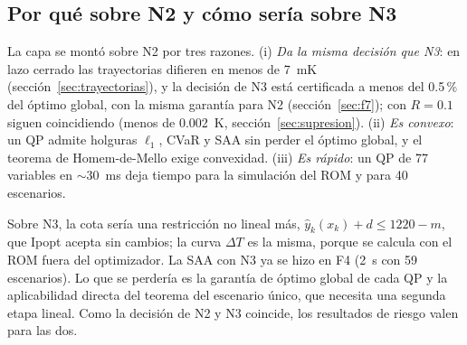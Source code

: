 \subsection{Por qué sobre N2 y cómo sería sobre N3}
La capa se montó sobre N2 por tres razones. (i) \emph{Da la misma decisión que N3}: en lazo
cerrado las trayectorias difieren en menos de 7~mK (sección~\ref{sec:trayectorias}), y la
decisión de N3 está certificada a menos del 0.5\,\% del óptimo global, con la misma garantía para
N2 (sección~\ref{sec:f7}); con $R=0.1$ siguen coincidiendo (menos de 0.002~K,
sección~\ref{sec:supresion}). (ii) \emph{Es convexo}: un QP admite holguras $\ell_1$, CVaR y SAA
sin perder el óptimo global, y el teorema de Homem-de-Mello exige convexidad. (iii) \emph{Es
rápido}: un QP de 77 variables en $\sim30$~ms deja tiempo para la simulación del ROM y para 40
escenarios.

Sobre N3, la cota sería una restricción no lineal más, $\hat y_k(x_k)+d\le1220-m$, que Ipopt
acepta sin cambios; la curva $\Delta T$ es la misma, porque se calcula con el ROM fuera del
optimizador. La SAA con N3 ya se hizo en F4 (2~s con 59 escenarios). Lo que se perdería es la
garantía de óptimo global de cada QP y la aplicabilidad directa del teorema del escenario único,
que necesita una segunda etapa lineal. Como la decisión de N2 y N3 coincide, los resultados de
riesgo valen para las dos.


